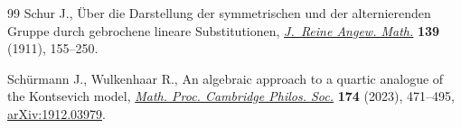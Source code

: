 \documentclass[10pt,a4paper]{amsart}
\providecommand{\LastPageEnding}{}
\numberwithin{equation}{section}
\begin{document}
\begin{thebibliography}{99}
Schur J., \"Uber die {D}arstellung der symmetrischen und der alternierenden
 {G}ruppe durch gebrochene lineare {S}ubstitutionen, \href{https://doi.org/10.1515/crll.1911.139.155}{\textit{J.~Reine Angew.
 Math.}} \textbf{139} (1911), 155--250.

Sch\"urmann J., Wulkenhaar R., An algebraic approach to a quartic analogue of
 the {K}ontsevich model, \href{https://doi.org/10.1017/S0305004122000366}{\textit{Math. Proc. Cambridge Philos. Soc.}}
 \textbf{174} (2023), 471--495, \href{https://arxiv.org/abs/1912.03979}{arXiv:1912.03979}.

\end{thebibliography}\LastPageEnding
\end{document}
